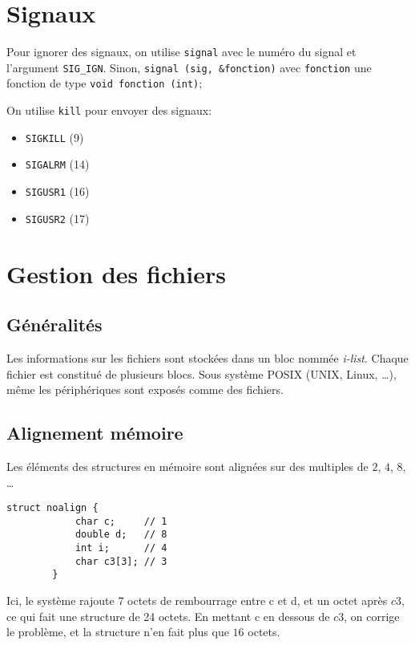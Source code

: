 \documentclass[a4paper]{article}
\begin{document}
\begin{multicols*}{2}


    \section{Signaux}

    Pour ignorer des signaux, on utilise \texttt{signal} avec le numéro du signal et l'argument \texttt{SIG\_IGN}. Sinon, \texttt{signal (sig, \&fonction)} avec \texttt{fonction} une fonction de type \texttt{void fonction (int)};

    On utilise \texttt{kill} pour envoyer des signaux:
    \begin{itemize}
        \item \texttt{SIGKILL} (9)
        \item \texttt{SIGALRM} (14)
        \item \texttt{SIGUSR1} (16)
        \item \texttt{SIGUSR2} (17)
    \end{itemize}

    \section{Gestion des fichiers}

    \subsection{Généralités}
    Les informations sur les fichiers sont stockées dans un bloc nommée \emph{i-list}.
    Chaque fichier est constitué de plusieurs blocs.
    Sous système {POSIX} ({UNIX}, Linux, \ldots), même les périphériques sont exposés comme des fichiers.

    \subsection{Alignement mémoire}

    Les éléments des structures en mémoire sont alignées sur des multiples de $2$, $4$, $8$, \ldots
    
    \begin{lstlisting}[frame=shadowbox]
        struct noalign {
            char c;     // 1
            double d;   // 8
            int i;      // 4
            char c3[3]; // 3
        }
    \end{lstlisting}

    Ici, le système rajoute $7$ octets de rembourrage entre c et d, et un octet après $c3$, ce qui fait une structure de 24 octets.
    En mettant c en dessous de $c3$, on corrige le problème, et la structure n'en fait plus que $16$ octets.


\end{multicols*}
\end{document}
